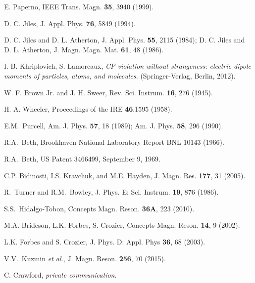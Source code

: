 \documentclass[review,number,sort&compress]{elsarticle}
\begin{document}
\begin{thebibliography}{00}
 E. Paperno, IEEE Trans. Magn. {\bf
  35}, 3940 (1999).

 D. C. Jiles, J. Appl. Phys. {\bf 76}, 5849 (1994).

 D. C. Jiles and D. L. Atherton,
  J. Appl. Phys. {\bf 55}, 2115 (1984); D. C. Jiles and D. L. Atherton,
  J. Magn. Magn. Mat. {\bf 61}, 48 (1986).



 I. B. Khriplovich,
  S. Lamoreaux, {\it CP violation without strangeness: electric dipole
    moments of particles, atoms, and molecules.} (Springer-Verlag,
  Berlin, 2012).



 W. F. Brown Jr. and J. H. Sweer, Rev. Sci. Instrum. {\bf 16},  276 (1945).

 H. A. Wheeler, Proceedings of the IRE {\bf 46},1595 (1958).  %

E.M.\ Purcell, %
Am. J. Phys. \textbf{57}, 18 (1989); Am. J. Phys. \textbf{58}, 296 (1990). %




 R.A.\  Beth, Brookhaven National Laboratory Report %
BNL-10143 (1966). %

 R.A.\  Beth, %
US Patent 3466499, September 9, 1969.


 C.P. Bidinosti, I.S. Kravchuk, and
  M.E. Hayden, J. Magn. Res. {\bf 177}, 31 (2005).
  

 R.\ Turner and R.M.\ Bowley, %
J. Phys. E: Sci. Instrum. \textbf{19}, 876 (1986). %

 S.S.\ Hidalgo-Tobon, %
Concepts Magn. Reson. \textbf{36A}, 223 (2010).  %

 M.A. Brideson, L.K. Forbes, S. Crozier, Concepts Magn. Reson. {\bf 14}, 9 (2002).

 L.K. Forbes and S. Crozier, J. Phys. D: Appl. Phys {\bf 36}, 68 (2003).

 V.V.\ Kuzmin  {\it et al.}, J. Magn. Reson. {\bf 256}, 70 (2015).

 C. Crawford, \textit{private communication}.





\end{thebibliography}
\end{document}
